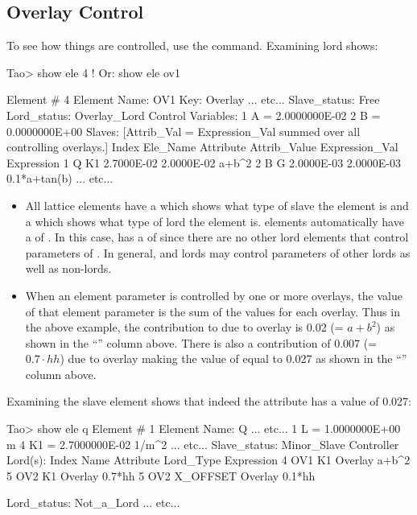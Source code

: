 \documentclass{hitec}     %
\begin{document}
\newpage

\subsection{Overlay Control}

To see how things are controlled, use the  command. Examining lord  shows:
\begin{code}
Tao> show ele 4    ! Or: show ele ov1

 Element #                4
 Element Name: OV1
 Key: Overlay
... etc...
Slave_status: Free
Lord_status:  Overlay_Lord
Control Variables:
    1   A                                         =  2.0000000E-02
    2   B                                         =  0.0000000E+00
Slaves: [Attrib_Val = Expression_Val summed over all controlling overlays.]
   Index   Ele_Name   Attribute Attrib_Value  Expression_Val    Expression
       1   Q          K1          2.7000E-02      2.0000E-02    a+b^2
       2   B          G           2.0000E-03      2.0000E-03    0.1*a+tan(b)
... etc...
\end{code}

\begin{itemize}
\item
All lattice elements have a  which shows what type of slave the element is and a
 which shows what type of lord the element is.  elements automatically
have a  of . In this case,  has a  of
 since there are no other lord elements that control parameters of . In general,
 and  lords may control parameters of other lords as well as non-lords.
\item
When an element parameter is controlled by one or more overlays, the value of that element parameter
is the sum of the values for each overlay. Thus in the above example, the contribution to  due
to overlay  is 0.02 (= $a+b^2$) as shown in the ``'' column above. There is 
also a contribution of 0.007 (= $0.7 \cdot hh$) due to overlay  making the value of 
equal to 0.027 as shown in the ``'' column above. 
\end{itemize}

Examining the  slave element shows that indeed the  attribute has a value of 0.027:
\begin{code}
Tao> show ele q
 Element #                1
 Element Name: Q
        ... etc...
    1   L                           =  1.0000000E+00 m
    4   K1                          =  2.7000000E-02 1/m^2
        ... etc...
Slave_status: Minor_Slave
Controller Lord(s):
   Index   Name        Attribute           Lord_Type           Expression
       4   OV1         K1                  Overlay             a+b^2
       5   OV2         K1                  Overlay             0.7*hh
       5   OV2         X_OFFSET            Overlay             0.1*hh

Lord_status:  Not_a_Lord
        ... etc...
\end{code}
\end{document}
